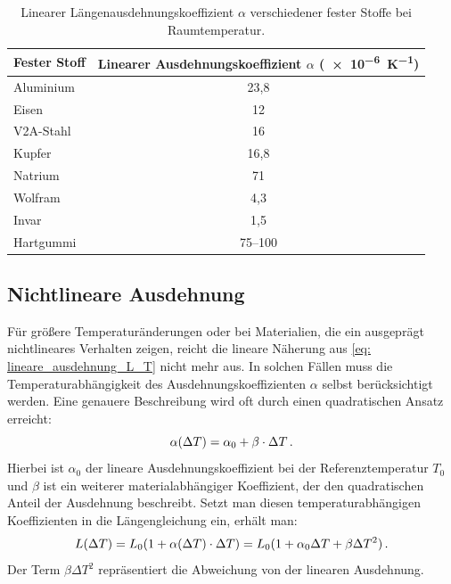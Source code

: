 \begin{table}[htb]
    \centering
    \caption{Linearer Längenausdehnungskoeffizient $\alpha$ verschiedener fester Stoffe bei Raumtemperatur.}\label{tab: lineare_ausdehnungskoeffizienten}
    \vspace{4pt}
    \begin{tabular}{lc}
        \toprule
        \textbf{Fester Stoff} & \textbf{Linearer Ausdehnungskoeffizient $\alpha$ (\SI{e-6}{\kelvin^{-1}})} \\
        \midrule
        Aluminium     & 23,8 \\
        Eisen         & 12   \\
        V2A-Stahl     & 16   \\
        Kupfer        & 16,8 \\
        Natrium       & 71   \\
        Wolfram       & 4,3  \\
        Invar         & 1,5  \\
        Hartgummi     & 75--100 \\
        \bottomrule
    \end{tabular}
\end{table}


\subsection{Nichtlineare Ausdehnung}\label{subsec: nichtlineare_ausdehnung}
Für größere Temperaturänderungen oder bei Materialien, die ein ausgeprägt nichtlineares Verhalten zeigen, reicht die lineare Näherung aus \cref{eq: lineare_ausdehnung_L_T} nicht mehr aus. In solchen Fällen muss die Temperaturabhängigkeit des Ausdehnungskoeffizienten $\alpha$ selbst berücksichtigt werden. Eine genauere Beschreibung wird oft durch einen quadratischen Ansatz erreicht:
\begin{equation}\label{eq: alpha_von_DeltaT}
    \alpha(\Delta T) = \alpha_0 + \beta \cdot \Delta T \,.
\end{equation}
Hierbei ist $\alpha_0$ der lineare Ausdehnungskoeffizient bei der Referenztemperatur $T_0$ und $\beta$ ist ein weiterer materialabhängiger Koeffizient, der den quadratischen Anteil der Ausdehnung beschreibt. Setzt man diesen temperaturabhängigen Koeffizienten in die Längengleichung ein, erhält man:
\begin{equation}\label{eq:nichtlineare_ausdehnung}
    L(\Delta T) = L_0 (1+ \alpha(\Delta T)\cdot \Delta T) = L_0 (1 + \alpha_0 \Delta T + \beta \Delta T^2) \,.
\end{equation}
Der Term $\beta \Delta T^2$ repräsentiert die Abweichung von der linearen Ausdehnung.

